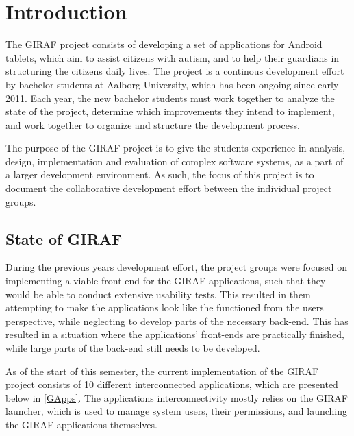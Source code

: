\chapter{Introduction}
The GIRAF project consists of developing a set of applications for Android
tablets, which aim to assist citizens with autism, and to help their guardians in 
structuring the citizens daily lives. The project is a continous development
effort by bachelor students at Aalborg University, which has been
ongoing since early 2011. Each year, the new bachelor students must work
together to analyze the state of the project, determine which improvements
they intend to implement, and work together to organize and structure the
development process.\nl

The purpose of the GIRAF project is to give the students experience in analysis,
design, implementation and evaluation of complex software systems, as a part of
a larger development environment. As such, the focus of this project is to
document the collaborative development effort between the individual project
groups.


\section{State of GIRAF}
During the previous years development effort, the project groups were focused
on implementing a viable front-end for the GIRAF applications, such that they
would be able to conduct extensive usability tests. This resulted in them
attempting to make the applications look like the functioned from the users
perspective, while neglecting to develop parts of the necessary back-end.
This has resulted in a situation where the applications' front-ends are
practically finished, while large parts of the back-end still needs to be
developed.\nl

As of the start of this semester, the current implementation of the GIRAF
project consists of 10 different interconnected applications, which are
presented below in \autoref{GApps}. The applications interconnectivity mostly
relies on the GIRAF launcher, which is used to manage system users, their
permissions, and launching the GIRAF applications themselves. 


